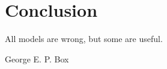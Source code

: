 \chapter{Conclusion}
\setlength{\epigraphwidth}{.45\textwidth}
\epigraph{All models are wrong, but some are useful.}{George E. P. Box}